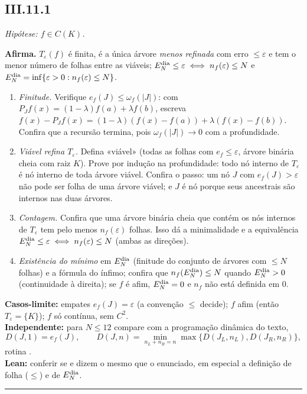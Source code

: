 \documentclass[11pt,a4paper]{article}
\newcommand{\ef}{e_f}
\newcommand{\Edia}{E_N^{\rm dia}}
\newcommand{\blk}[1]{\textbf{#1}}
\newenvironment{roteiro}[3]{%
  \subsection*{#1\quad{\normalfont #2}}
  \par\noindent\textit{#3}\par}{\vspace{4pt}\hrule\vspace{2pt}}
\begin{document}
\begin{roteiro}{III.11.1}{Minimalidade exata do limiar (p.~70)}{Hipótese: $f\in C(K)$.}
\blk{Afirma.} $T_\varepsilon(f)$ é finita, é a única árvore \emph{menos refinada} com erro $\le\varepsilon$ e tem o menor número de folhas entre as viáveis; $\Edia\le\varepsilon\iff n_f(\varepsilon)\le N$ e $\Edia=\inf\{\varepsilon>0:n_f(\varepsilon)\le N\}$.
\begin{enumerate}[leftmargin=1.8em]
\item \emph{Finitude.} Verifique $\ef(J)\le\omega_f(|J|)$: com $P_Jf(x)=(1-\lambda)f(a)+\lambda f(b)$, escreva $f(x)-P_Jf(x)=(1-\lambda)(f(x)-f(a))+\lambda(f(x)-f(b))$. Confira que a recursão termina, pois $\omega_f(|J|)\to0$ com a profundidade.
\item \emph{Viável refina $T_\varepsilon$.} Defina «viável» (todas as folhas com $\ef\le\varepsilon$, árvore binária cheia com raiz $K$). Prove por indução na profundidade: todo nó interno de $T_\varepsilon$ é nó interno de toda árvore viável. Confira o passo: um nó $J$ com $\ef(J)>\varepsilon$ não pode ser folha de uma árvore viável; e $J$ é nó porque seus ancestrais são internos nas duas árvores.
\item \emph{Contagem.} Confira que uma árvore binária cheia que contém os nós internos de $T_\varepsilon$ tem pelo menos $n_f(\varepsilon)$ folhas. Isso dá a minimalidade e a equivalência $\Edia\le\varepsilon\iff n_f(\varepsilon)\le N$ (ambas as direções).
\item \emph{Existência do mínimo} em $\Edia$ (finitude do conjunto de árvores com $\le N$ folhas) e a fórmula do ínfimo; confira que $n_f(\Edia)\le N$ quando $\Edia>0$ (continuidade à direita); se $f$ é afim, $\Edia=0$ e $n_f$ não está definida em $0$.
\end{enumerate}
\blk{Casos-limite:} empates $\ef(J)=\varepsilon$ (a convenção $\le$ decide); $f$ afim (então $T_\varepsilon=\{K\}$); $f$ só contínua, sem $C^2$.\\
\blk{Independente:} para $N\le12$ compare com a programação dinâmica do texto,
\[D(J,1)=\ef(J),\qquad D(J,n)=\min_{n_L+n_R=n}\max\{D(J_L,n_L),D(J_R,n_R)\},\]
rotina .\\
\blk{Lean:} conferir se  e  dizem o mesmo que o enunciado, em especial a definição de folha ($\le$) e de $\Edia$.
\end{roteiro}
\end{document}
